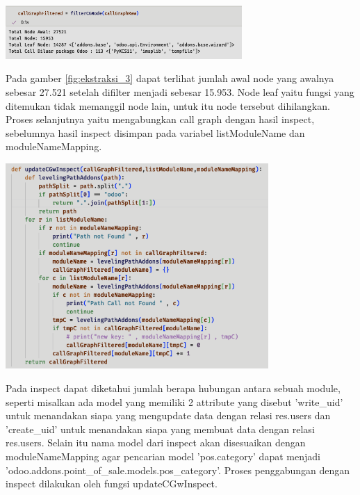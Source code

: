 \begin{center}
	\includegraphics[width=9cm]{img/bab_4/ekstraksi_3.png}
	\label{fig:ekstraksi_3}
\end{center}

Pada gamber \ref{fig:ekstraksi_3} dapat terlihat jumlah awal node yang awalnya sebesar 27.521 setelah difilter menjadi sebesar 15.953. Node leaf yaitu fungsi yang ditemukan tidak memanggil node lain, untuk itu node tersebut dihilangkan. Proses selanjutnya yaitu mengabungkan call graph dengan hasil inspect, sebelumnya hasil inspect disimpan pada variabel listModuleName dan moduleNameMapping. 

\begin{center}
	\includegraphics[width=10cm]{img/bab_4/ekstraksi_4.png}
	\label{fig:ekstraksi_4}
\end{center}

Pada inspect dapat diketahui jumlah berapa hubungan antara sebuah module, seperti misalkan ada model yang memiliki 2 attribute yang disebut 'write{\_}uid' untuk menandakan siapa  yang mengupdate data dengan relasi res.users dan 'create{\_}uid' untuk menandakan siapa  yang membuat data dengan relasi res.users. Selain itu nama model dari inspect akan disesuaikan dengan moduleNameMapping agar pencarian model 'pos.category' dapat menjadi 'odoo.addons.point{\_}of{\_}sale.models.pos{\_}category'. Proses penggabungan dengan inspect dilakukan oleh fungsi updateCGwInspect.

